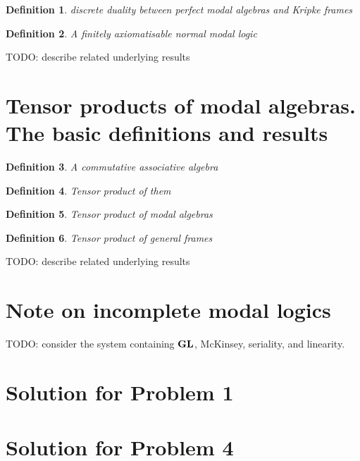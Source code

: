 \documentclass[a4paper]{article}
\theoremstyle{defin}
\newtheorem{defin}{Definition}
\theoremstyle{theorem}
\theoremstyle{prop}
\theoremstyle{lemma}
\theoremstyle{ex}
\theoremstyle{col}
\begin{document}
\begin{defin} discrete duality between perfect modal algebras and Kripke frames
\end{defin}

\begin{defin} A finitely axiomatisable normal modal logic
\end{defin}

TODO: describe related underlying results

\section{Tensor products of modal algebras. The basic definitions and results}

\begin{defin} A commutative associative algebra
\end{defin}

\begin{defin} Tensor product of them
\end{defin}

\begin{defin} Tensor product of modal algebras
\end{defin}

\begin{defin} Tensor product of general frames
\end{defin}

TODO: describe related underlying results

\section{Note on incomplete modal logics}

TODO: consider the system containing ${\bf GL}$, McKinsey, seriality, and linearity.

\section{Solution for Problem 1}

\section{Solution for Problem 4}

\newpage



\end{document}
